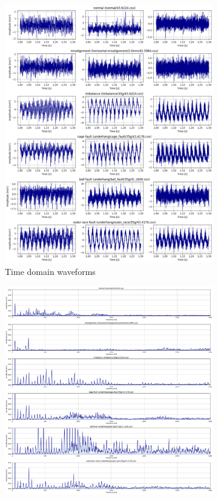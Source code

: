 \begin{figure}[ht]
    \centering
    \begin{subfigure}[b]{0.44\textwidth}
        \includegraphics[width=\textwidth]{assets/design/Mafaulda-A-time-waveform.png}
        \caption{Time domain waveforms}
        \label{fig:design:fault-temporal-waveform}
    \end{subfigure}
    \hfill
    \begin{subfigure}[b]{0.55\textwidth}
        \includegraphics[width=\textwidth]{assets/design/Mafaulda-A-spectrum-Y-axis.png}

\end{subfigure}
\end{figure}
